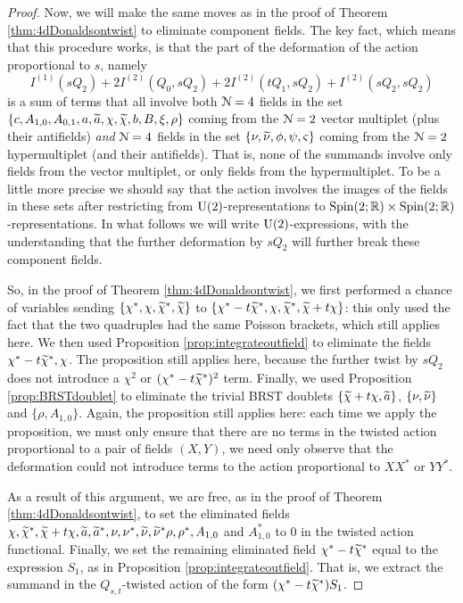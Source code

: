 \documentclass[10pt, oneside]{article}
\begin{document}
\begin{proof}
Now, we will make the same moves as in the proof of Theorem \ref{thm:4dDonaldsontwist} to eliminate component fields.  The key fact, which means that this procedure works, is that the part of the deformation of the action proportional to $s$, namely
\[I^{(1)}(sQ_2) + 2 I^{(2)}(Q_0, sQ_2) + 2 I^{(2)}(tQ_1, sQ_2) + I^{(2)}(sQ_2, sQ_2)\]
is a sum of terms that all involve both $\mathcal{N}=4$ fields in the set $\{c, A_{1,0}, A_{0,1}, a, \widetilde{a}, \chi, \widetilde{\chi}, b, B, \xi, \rho\}$ coming from the $\mathcal{N}=2$ vector multiplet (plus their antifields) \emph{and} $\mathcal{N}=4$ fields in the set $\{\nu, \widetilde{\nu}, \phi, \psi, \varsigma\}$ coming from the $\mathcal{N}=2$ hypermultiplet (and their antifields).  That is, none of the summands involve only fields from the vector multiplet, or only fields from the hypermultiplet.  To be a little more precise we should say that the action involves the images of the fields in these sets after restricting from $\mathrm{U}(2)$-representations to $\mathrm{Spin}(2;\mathbb R) \times \mathrm{Spin}(2;\mathbb R)$-representations.  In what follows we will write $\mathrm{U}(2)$-expressions, with the understanding that the further deformation by $sQ_2$ will further break these component fields.

So, in the proof of Theorem \ref{thm:4dDonaldsontwist}, we first performed a chance of variables sending $\{\chi^*, \chi, \widetilde{\chi}^*, \widetilde{\chi}\}$ to $\{\chi^*-t\widetilde{\chi}^*, \chi, \widetilde{\chi}^*, \widetilde{\chi} + t\chi\}$: this only used the fact that the two quadruples had the same Poisson brackets, which still applies here.  We then used Proposition \ref{prop:integrateoutfield} to eliminate the fields $\chi^*-t\widetilde{\chi}^*, \chi$.  The proposition still applies here, because the further twist by $sQ_2$ does not introduce a $\chi^2$ or $(\chi^*-t\widetilde{\chi}^*)^2$ term.  Finally, we used Proposition \ref{prop:BRSTdoublet} to eliminate the trivial BRST doublets $\{\widetilde{\chi} + t\chi, \widetilde{a}\}$, $\{\nu, \widetilde{\nu}\}$ and $\{\rho, A_{1, 0}\}$.  Again, the proposition still applies here: each time we apply the proposition, we must only ensure that there are no terms in the twisted action proportional to a pair of fields $(X, Y)$, we need only observe that the deformation could not introduce terms to the action proportional to $XX^*$ or $YY^*$.

As a result of this argument, we are free, as in the proof of Theorem \ref{thm:4dDonaldsontwist}, to set the eliminated fields $\chi, \widetilde{\chi}^*, \widetilde{\chi} + t\chi, \widetilde{a}, \widetilde{a}^*, \nu, \nu^*, \widetilde{\nu}, \widetilde{\nu}^* \rho, \rho^*, A_{1,0}$ and $A_{1,0}^*$ to 0 in the twisted action functional.  Finally, we set the remaining eliminated field $\chi^*-t\widetilde{\chi}^*$ equal to the expression $S_1$, as in Proposition \ref{prop:integrateoutfield}.  That is, we extract the summand in the $Q_{s,t}$-twisted action of the form $(\chi^* - t\widetilde{\chi}^*)S_1$.  


\end{proof}
\end{document}
